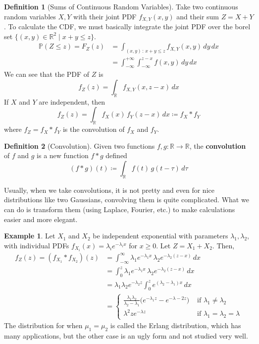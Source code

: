 \documentclass{article}
\theoremstyle{definition}
\newtheorem{example}{Example}[section]
\theoremstyle{remark}
\theoremstyle{definition}
\newtheorem{definition}{Definition}[section]
\begin{document}
\begin{definition}[Sums of Continuous Random Variables]
Take two continuous random variables $X, Y$ with their joint PDF $f_{X, Y} (x, y)$ and their sum $Z = X + Y$. To calculate the CDF, we must basically integrate the joint PDF over the borel set $\{(x, y) \in \mathbb{R}^2 \mid x + y \leq z\}$. 
\begin{align*}
    \mathbb{P}(Z \leq z) = F_Z (z) & = \int_{(x, y) \,:\, x + y \leq z} f_{X, Y} (x, y) \,dy\,dx \\
    & = \int_{-\infty}^{+\infty} \int_{-\infty}^{z - x} f(x, y) \,dy \,dx
\end{align*}
We can see that the PDF of $Z$ is 
\[f_{Z} (z) = \int_{\mathbb{R}} f_{X, Y} (x, z - x) \, dx\]
If $X$ and $Y$ are independent, then 
\[f_{Z} (z) = \int_{\mathbb{R}} f_{X} (x) \, f_Y (z - x) \,dx \coloneqq f_X \ast f_Y\]
where $f_Z = f_X \ast f_Y$ is the convolution of $f_X$ and $f_Y$. 
\end{definition}

\begin{definition}[Convolution]
Given two functions $f, g: \mathbb{R} \longrightarrow \mathbb{R}$, the \textbf{convolution} of $f$ and $g$ is a new function $f \ast g$ defined  
\[(f \ast g) (t) \coloneqq \int_\mathbb{R} f(t)\, g(t - \tau) \, d \tau\]
\end{definition}

Usually, when we take convolutions, it is not pretty and even for nice distributions like two Gaussians, convolving them is quite complicated. What we can do is transform them (using Laplace, Fourier, etc.) to make calculations easier and more elegant. 

\begin{example}
Let $X_1$ and $X_2$ be independent exponential with parameters $\lambda_1, \lambda_2$, with individual PDFs $f_{X_i} (x) = \lambda_i e^{-\lambda_i x}$ for $x \geq 0$. Let $Z = X_1 + X_2$. Then, 
\begin{align*}
    f_Z (z) = (f_{X_1} \ast f_{X_2})(z) & = \int_{-\infty}^\infty \lambda_1 e^{-\lambda_1 x} \, \lambda_2 e^{-\lambda_2 (z -x)} \, dx \\
    & = \int_{0}^z \lambda_1 e^{-\lambda_1 x} \, \lambda_2 e^{-\lambda_2 (z -x)} \, dx \\ 
    & = \lambda_1 \lambda_2 e^{-\lambda_2 z} \int_0^z e^{(\lambda_2 - \lambda_1) x}\,dx \\
    & = \begin{cases} \frac{\lambda_1 \lambda_2}{\lambda_2 - \lambda_1} \big( e^{-\lambda_1 z} - e^{-\lambda-2 z} \big) & \text{ if } \lambda_1 \neq \lambda_2 \\
    \lambda^2 z e^{-\lambda z} & \text{ if } \lambda_1 = \lambda_2 = \lambda \end{cases} 
\end{align*}
The distribution for when $\mu_1 = \mu_2$ is called the Erlang distribution, which has many applications, but the other case is an ugly form and not studied very well. 
\end{example}
\end{document}
